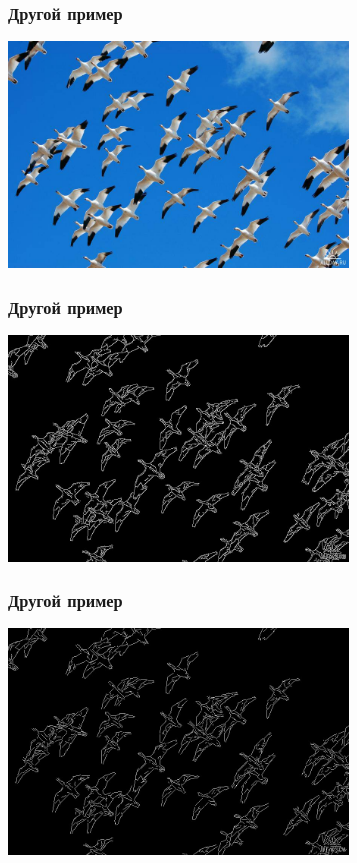 \begin{frame}\frametitle{Другой пример}
    \begin{center}
        \includegraphics[height=6cm]{veselov_imgs/image1.jpg}
    \end{center}
\end{frame}

\begin{frame}\frametitle{Другой пример}
    \begin{center}
        \includegraphics[height=6cm]{veselov_imgs/edge_map1.jpg}
    \end{center}
\end{frame}

\begin{frame}\frametitle{Другой пример}
    \begin{center}
        \includegraphics[height=6cm]{veselov_imgs/l_edge_map1.jpg}
    \end{center}
\end{frame}

